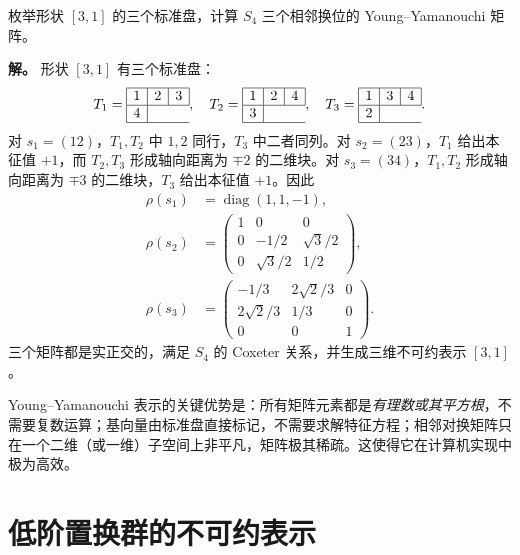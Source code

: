 \begin{example}
枚举形状 $[3,1]$ 的三个标准盘，计算 $S_4$ 三个相邻换位的 Young--Yamanouchi 矩阵。

\textbf{解。} 形状 $[3,1]$ 有三个标准盘：
\[
T_1=\begin{array}{|c|c|c|}\hline1&2&3\\\hline4\\\cline{1-3}\end{array},\quad
T_2=\begin{array}{|c|c|c|}\hline1&2&4\\\hline3\\\cline{1-3}\end{array},\quad
T_3=\begin{array}{|c|c|c|}\hline1&3&4\\\hline2\\\cline{1-3}\end{array}.
\]
对 $s_1=(12)$，$T_1,T_2$ 中 $1,2$ 同行，$T_3$ 中二者同列。对 $s_2=(23)$，$T_1$ 给出本征值 $+1$，而 $T_2,T_3$ 形成轴向距离为 $\mp2$ 的二维块。对 $s_3=(34)$，$T_1,T_2$ 形成轴向距离为 $\mp3$ 的二维块，$T_3$ 给出本征值 $+1$。因此
\begin{align*}
\rho(s_1)&=\operatorname{diag}(1,1,-1),\\
\rho(s_2)&=\begin{pmatrix}1&0&0\\0&-1/2&\sqrt3/2\\0&\sqrt3/2&1/2\end{pmatrix},\\
\rho(s_3)&=\begin{pmatrix}-1/3&2\sqrt2/3&0\\2\sqrt2/3&1/3&0\\0&0&1\end{pmatrix}.
\end{align*}
三个矩阵都是实正交的，满足 $S_4$ 的 Coxeter 关系，并生成三维不可约表示 $[3,1]$。
\end{example}

Young--Yamanouchi 表示的关键优势是：所有矩阵元素都是\emph{有理数或其平方根}，不需要复数运算；基向量由标准盘直接标记，不需要求解特征方程；相邻对换矩阵只在一个二维（或一维）子空间上非平凡，矩阵极其稀疏。这使得它在计算机实现中极为高效。

\section{低阶置换群的不可约表示}
\label{sec:low-sn-irreps}

